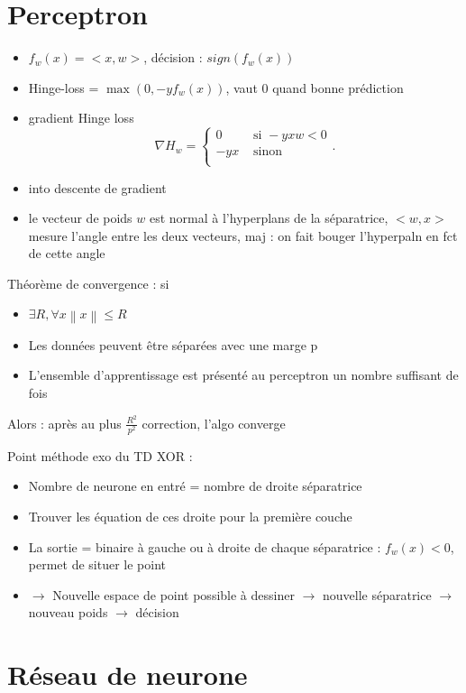 \documentclass{article}
\begin{document}
\begin{multicols}{2}
\section{Perceptron}
\begin{itemize}
    \item $ f_w(x) = <x, w> $, décision : $ sign(f_w(x)) $  
    \item Hinge-loss = $ \max (0, -y f_w(x)) $, vaut 0 quand bonne prédiction
    \item gradient Hinge loss 
    \[
        \nabla H_w = \begin{cases}
        0 &\text{ si } -y x w < 0\\
        -yx &\text{ sinon}\\
        \end{cases} 
    .\]
    \item into descente de gradient
    \item le vecteur de poids $ w $ est normal à l'hyperplans de la séparatrice, $ <w, x> $ mesure l'angle entre les deux vecteurs, maj : on fait bouger l'hyperpaln en fct de cette angle 
\end{itemize}
Théorème de convergence : si
\begin{itemize}
    \item $ \exists R, \forall x \left\| x \right\| \leq R $ 
    \item Les données peuvent être séparées avec une marge p
    \item L'ensemble d'apprentissage est présenté au perceptron un nombre suffisant
    de fois
\end{itemize}
Alors : après au plus $ \frac{R^2}{p^2} $ correction, l'algo converge

Point méthode exo du TD XOR : 
\begin{itemize}
    \item Nombre de neurone en entré = nombre de droite séparatrice
    \item Trouver les équation de ces droite pour la première couche
    \item La sortie = binaire à gauche ou à droite de chaque séparatrice : $ f_w(x) < 0 $, permet de situer le point 
    \item $\rightarrow$ Nouvelle espace de point possible à dessiner $\rightarrow$ nouvelle séparatrice $\rightarrow$ nouveau poids $\rightarrow$ décision
\end{itemize}
\section{Réseau de neurone}

\end{multicols}
\end{document}
